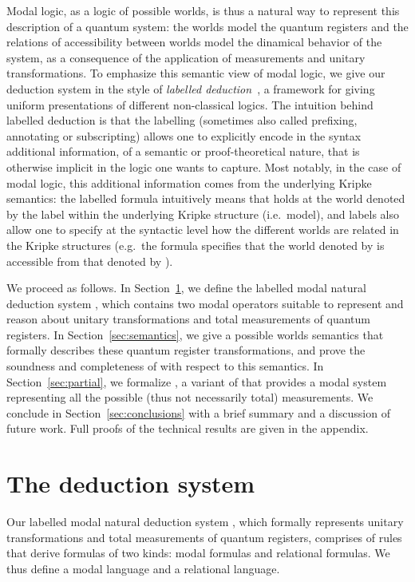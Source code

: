 \documentclass[times, 10pt]{article}
\begin{document}
Modal logic, as a logic of possible worlds, is thus a natural way to
represent this description of a quantum system: the worlds model the
quantum registers and the relations of accessibility between worlds
model the dinamical behavior of the system, as a consequence of the
application of measurements and unitary transformations. To emphasize
this semantic view of modal logic, we give our deduction system in the
style of \emph{labelled
  deduction}~\cite{Gabbay96,Simpson93,Vigano00a}, a framework for
giving uniform presentations of different non-classical logics.  The
intuition behind labelled deduction is that the labelling (sometimes
also called prefixing, annotating or subscripting) allows one to
explicitly encode in the syntax additional information, of a semantic
or proof-theoretical nature, that is otherwise implicit in the logic
one wants to capture. Most notably, in the case of modal logic, this
additional information comes from the underlying Kripke semantics: the
labelled formula  intuitively means that  holds at the world
denoted by the label  within the underlying Kripke structure
(i.e.~model), and labels also allow one to specify at the syntactic
level how the different worlds are related in the Kripke structures
(e.g.~the formula  specifies that the world denoted by  is
accessible from that denoted by ).

We proceed as follows. In Section~\ref{sec:syntax}, we define the labelled modal natural deduction system , which contains two modal operators suitable to represent and reason about unitary transformations and total measurements of quantum registers. In Section~\ref{sec:semantics}, we 
give a  possible worlds semantics that formally describes these quantum register transformations, 
and prove the soundness and completeness of  with respect to this semantics. In Section~\ref{sec:partial}, we formalize , a variant of  that provides a modal system 
representing all the possible (thus not necessarily total) measurements.  We
conclude in Section~\ref{sec:conclusions} with a brief summary and a discussion of future work.
Full proofs of the technical results are given in the appendix.



\section{The deduction system }
\label{sec:syntax}

Our labelled modal natural deduction system , which formally represents unitary transformations and total measurements of quantum registers,
comprises of rules that derive formulas of two kinds: modal formulas and relational formulas. We 
thus define a modal language and a relational language. 
\end{document}
